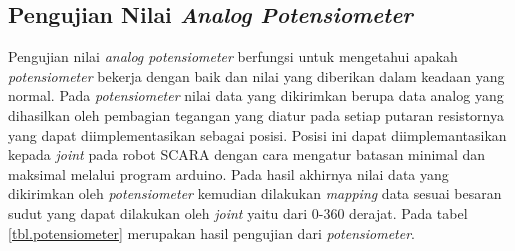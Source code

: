 \subsection{Pengujian Nilai\textit{ Analog Potensiometer}}
Pengujian nilai \textit{analog potensiometer} berfungsi untuk mengetahui apakah \textit{potensiometer} bekerja dengan baik dan nilai yang diberikan dalam keadaan yang normal. Pada \textit{potensiometer} nilai data yang dikirimkan berupa data analog yang dihasilkan oleh pembagian tegangan yang diatur pada setiap putaran resistornya yang dapat diimplementasikan sebagai posisi. Posisi ini dapat diimplemantasikan kepada \textit{joint} pada robot SCARA dengan cara mengatur batasan minimal dan maksimal melalui program arduino. Pada hasil akhirnya nilai data yang dikirimkan oleh \textit{potensiometer} kemudian dilakukan \textit{mapping} data sesuai besaran sudut yang dapat dilakukan oleh \textit{joint} yaitu dari 0-360 derajat. Pada tabel \ref{tbl.potensiometer}  merupakan hasil pengujian dari \textit{potensiometer}.

